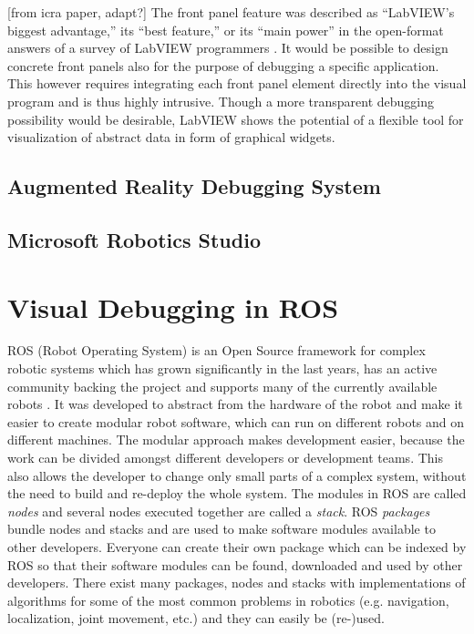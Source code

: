 [from icra paper, adapt?]
The front panel feature was described as ``LabVIEW's biggest advantage,'' its ``best feature,'' or its ``main power'' in the open-format answers of a survey of LabVIEW programmers \cite{Whitley2001}. It would be possible to design concrete front panels also for the purpose of debugging a specific application. This however requires integrating each front panel element directly into the visual program and is thus highly intrusive. Though a more transparent debugging possibility would be desirable, LabVIEW shows the potential of a flexible tool for visualization of abstract data in form of graphical widgets.

\subsection{Augmented Reality Debugging System}
\cite{Collett2010}
\subsection{Microsoft Robotics Studio}
\cite{Jackson2007}

\section{Visual Debugging in ROS}
\label{debugging_ros}

ROS (Robot Operating System) \cite{Quigley2009} is an Open Source framework for complex robotic systems which has grown significantly in the last years, has an active community backing the project and supports many of the currently available robots \cite{Foote2012}. It was developed to abstract from the hardware of the robot and make it easier to create modular robot software, which can run on different robots and on different machines. The modular approach makes development easier, because the work can be divided amongst different developers or development teams. This also allows the developer to change only small parts of a complex system, without the need to build and re-deploy the whole system.
The modules in ROS are called \emph{nodes} and several nodes executed together are called a \emph{stack}. ROS \emph{packages} bundle nodes and stacks and are used to make software modules available to other developers. Everyone can create their own package which can be indexed by ROS so that their software modules can be found, downloaded and used by other developers. There exist many packages, nodes and stacks with implementations of algorithms for some of the most common problems in robotics (e.g. navigation, localization, joint movement, etc.) and they can easily be (re-)used.

